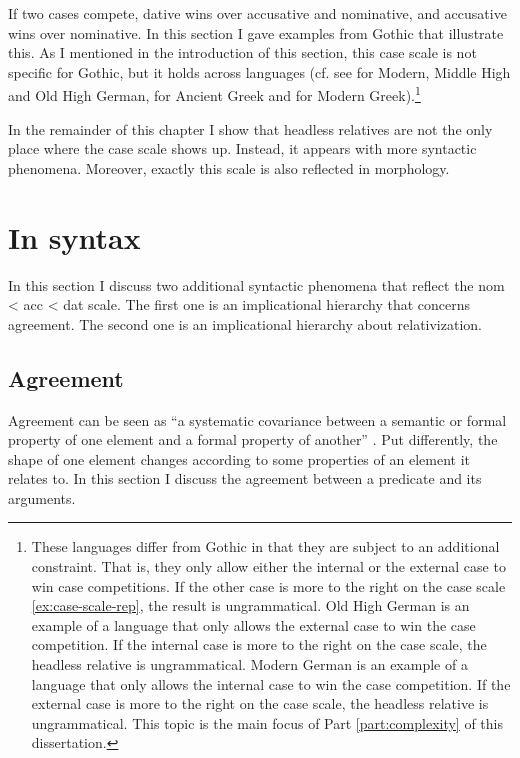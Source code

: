 If two cases compete, dative wins over accusative and nominative, and accusative wins over nominative. In this section I gave examples from Gothic that illustrate this. As I mentioned in the introduction of this section, this case scale is not specific for Gothic, but it holds across languages (cf. see \citealt{pittner1995} for Modern, Middle High and Old High German, \citealt{grosu2003} for Ancient Greek and \citealt{daskalaki2011} for Modern Greek).\footnote{
These languages differ from Gothic in that they are subject to an additional constraint. That is, they only allow either the internal or the external case to win case competitions. If the other case is more to the right on the case scale \ref{ex:case-scale-rep}, the result is ungrammatical.
Old High German is an example of a language that only allows the external case to win the case competition. If the internal case is more to the right on the case scale, the headless relative is ungrammatical. Modern German is an example of a language that only allows the internal case to win the case competition. If the external case is more to the right on the case scale, the headless relative is ungrammatical.
This topic is the main focus of Part \ref{part:complexity} of this dissertation.}

In the remainder of this chapter I show that headless relatives are not the only place where the case scale shows up. Instead, it appears with more syntactic phenomena. Moreover, exactly this scale is also reflected in morphology.


\section{In syntax}\label{sec:impl-hier}

In this section I discuss two additional syntactic phenomena that reflect the \ac{nom} < \ac{acc} < \ac{dat} scale. The first one is an implicational hierarchy that concerns agreement. The second one is an implicational hierarchy about relativization.


\subsection{Agreement}

Agreement can be seen as ``a systematic covariance between a semantic or formal property of one element and a formal property of another'' \citep{steel1978}. Put differently, the shape of one element changes according to some properties of an element it relates to. In this section I discuss the agreement between a predicate and its arguments.

